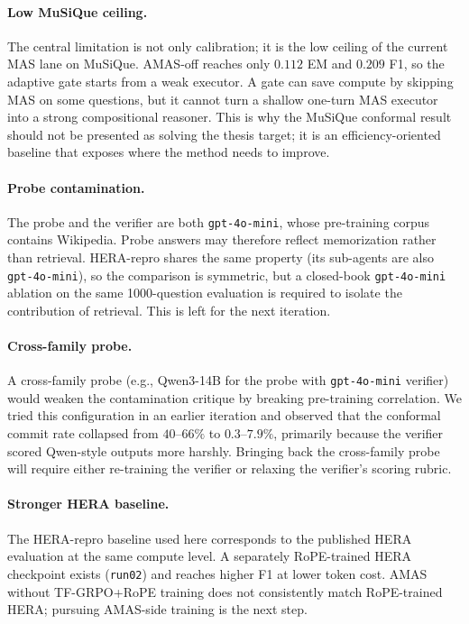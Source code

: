 \documentclass[11pt]{article}
\newcommand{\amas}{AMAS\xspace}
\newcommand{\hera}{HERA\xspace}
\newcommand{\mas}{MAS\xspace}
\newcommand{\code}[1]{\texttt{\small #1}}
\begin{document}
\paragraph{Low MuSiQue ceiling.}
The central limitation is not only calibration; it is the low ceiling of the
current \mas lane on MuSiQue. \amas-off reaches only $0.112$ EM and $0.209$
F1, so the adaptive gate starts from a weak executor. A gate can save
compute by skipping \mas on some questions, but it cannot turn a shallow
one-turn \mas executor into a strong compositional reasoner. This is why the
MuSiQue conformal result should not be presented as solving the thesis
target; it is an efficiency-oriented baseline that exposes where the method
needs to improve.

\paragraph{Probe contamination.}
The probe and the verifier are both \code{gpt-4o-mini}, whose pre-training
corpus contains Wikipedia. Probe answers may therefore reflect memorization
rather than retrieval. \hera-repro shares the same property (its
sub-agents are also \code{gpt-4o-mini}), so the comparison is symmetric, but
a closed-book \code{gpt-4o-mini} ablation on the same 1000-question
evaluation is required to isolate the contribution of retrieval. This is
left for the next iteration.

\paragraph{Cross-family probe.}
A cross-family probe (e.g., Qwen3-14B for the probe with \code{gpt-4o-mini}
verifier) would weaken the contamination critique by breaking pre-training
correlation. We tried this configuration in an earlier iteration and
observed that the conformal commit rate collapsed from $40$--$66\%$ to
$0.3$--$7.9\%$, primarily because the verifier scored Qwen-style outputs
more harshly. Bringing back the cross-family probe will require either
re-training the verifier or relaxing the verifier's scoring rubric.

\paragraph{Stronger \hera baseline.}
The \hera-repro baseline used here corresponds to the published \hera
evaluation at the same compute level. A separately RoPE-trained \hera
checkpoint exists (\code{run02}) and reaches higher F1 at lower token cost.
\amas without TF-GRPO+RoPE training does not consistently match
RoPE-trained \hera; pursuing \amas-side training is the next step.
\end{document}
